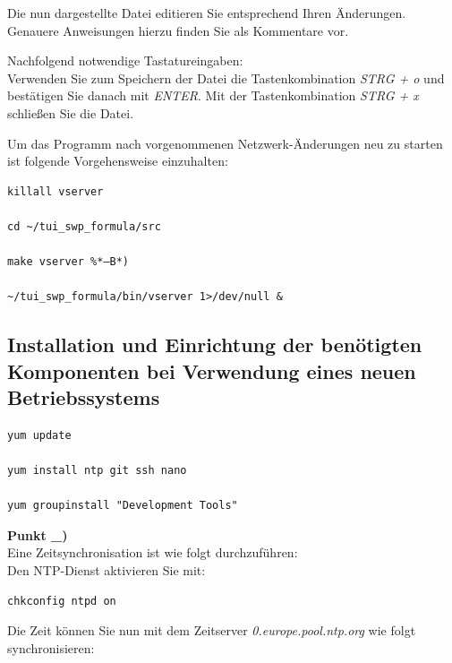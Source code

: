 \documentclass[fontsize = 12pt, paper = a4]{scrreprt}
\begin{document}
Die nun dargestellte Datei editieren Sie entsprechend Ihren Änderungen. Genauere Anweisungen hierzu finden Sie als Kommentare vor.

Nachfolgend notwendige Tastatureingaben: \\

Verwenden Sie zum Speichern der Datei die Tastenkombination \textit{STRG + o} und bestätigen Sie danach mit \textit{ENTER}. Mit der Tastenkombination \textit{STRG + x} schließen Sie die Datei. 

Um das Programm nach vorgenommenen Netzwerk-Änderungen neu zu starten ist folgende Vorgehensweise einzuhalten:

\vspace*{4mm}
\begin{lstlisting}[frame=single]
killall vserver

cd ~/tui_swp_formula/src
	
make vserver %*–B*)

~/tui_swp_formula/bin/vserver 1>/dev/null &
\end{lstlisting} 
\vspace*{-2mm}

\subsection{Installation und Einrichtung der benötigten Komponenten bei Verwendung eines neuen Betriebssystems}

\vspace*{4mm}
\begin{lstlisting}[frame=single]
yum update

yum install ntp git ssh nano

yum groupinstall "Development Tools"
\end{lstlisting} 
\vspace*{-2mm}

\textbf{Punkt \_)} \\

Eine Zeitsynchronisation ist wie folgt durchzuführen: \\
Den NTP-Dienst aktivieren Sie mit: 

\vspace*{4mm}
\begin{lstlisting}[frame=single]
chkconfig ntpd on
\end{lstlisting} 
\vspace*{-2mm}

\newpage

Die Zeit können Sie nun mit dem Zeitserver \textit{0.europe.pool.ntp.org} wie folgt synchronisieren:
\end{document}
